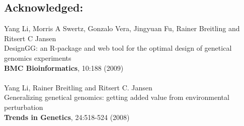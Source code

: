 \documentclass[8pt, twoside, a5paper]{report}
\newcommand{\authors}[1]{\small{#1}}
\newcommand{\bold}[1]{{\bfseries #1}}
\begin{document}
\subsection*{Acknowledged:}
  \authors{Yang Li, Morris A Swertz, Gonzalo Vera, Jingyuan Fu, Rainer Breitling and Ritsert C Jansen}\\
  DesignGG: an R-package and web tool for the optimal design of genetical genomics experiments\\
  \bold{BMC Bioinformatics}, 10:188 (2009)\\\\
  \authors{Yang Li, Rainer Breitling and Ritsert C. Jansen}\\
  Generalizing genetical genomics: getting added value from environmental perturbation\\
  \bold{Trends in Genetics}, 24:518-524 (2008)



\end{document}
